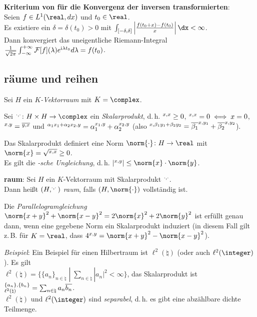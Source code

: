 \textbf{Kriterium von  für die Konvergenz der inversen
transformierten}:\\
Seien $f \in L^1(\real, dx)$ und $t_0 \in \real$.\\
Es existiere ein $\delta = \delta(t_0) > 0$ mit
$\int_{[-\delta, \delta]}
\left|\frac{f(t_0 + x) - f(t_0)}{x}\right| \dx < \infty$.\\
Dann konvergiert das uneigentliche Riemann-Integral
$\frac{1}{\sqrt{2\pi}}
\int_{-\infty}^{+\infty} \mathcal{F}[f](\lambda) e^{\mathrm{i} \lambda t_0} d\lambda = f(t_0)$.

\pagebreak

\subsection{%
    räume und reihen%
}

Sei $H$ ein \emph{$K$-Vektorraum} mit $K = \complex$.

Sei $\sp{\cdot, \cdot}\colon H \times H \rightarrow \complex$
ein \emph{Skalarprodukt}, d.\,h.
$\sp{x, x} \ge 0$,
$\sp{x, x} = 0 \iff x = 0$,
$\sp{x, y} = \overline{\sp{y, x}}$ und
$\sp{\alpha_1 x_1 + \alpha_2 x_2, y} =
\alpha_1 \sp{x_1, y} + \alpha_2 \sp{x_2, y}$
(also $\sp{x, \beta_1 y_1 + \beta_2 y_2} =
\overline{\beta_1} \sp{x, y_1} + \overline{\beta_2} \sp{x, y_2}$).

Das Skalarprodukt definiert eine Norm $\norm{\cdot}\colon H \rightarrow \real$
mit $\norm{x} = \sqrt{\sp{x, x}} \ge 0$.\\
Es gilt die \emph{-sche Ungleichung}, d.\,h.
$|\sp{x, y}| \le \norm{x} \cdot \norm{y}$.

\textbf{raum}:
Sei $H$ ein $K$-Vektorraum mit Skalarprodukt $\sp{\cdot, \cdot}$.\\
Dann heißt $(H, \sp{\cdot, \cdot})$ \emph{raum}, falls
$(H, \norm{\cdot})$ vollständig ist.

Die \emph{Parallelogramgleichung}
$\norm{x + y}^2 + \norm{x - y}^2 = 2 \norm{x}^2 + 2 \norm{y}^2$ ist
erfüllt genau dann, wenn eine gegebene Norm ein Skalarprodukt induziert
(in diesem Fall gilt z.\,B. für $K = \real$, dass
$4 \sp{x, y} = \norm{x + y}^2 - \norm{x - y}^2$).

\linie

\emph{Beispiel}:
Ein Beispiel für einen Hilbertraum ist
$\ell^2(\natural)$ (oder auch $\ell^2(\integer)$).
Es gilt\\
$\ell^2(\natural) = \{\{a_n\}_{n \in \natural} \;|\;
\sum_{n \in \natural} |a_n|^2 < \infty\}$,
das Skalarprodukt ist
$\sp{\{a_n\}, \{b_n\}}_{\ell^2(\natural)} =
\sum_{n \in \natural} a_n \overline{b_n}$.\\
$\ell^2(\natural)$ und $\ell^2(\integer)$ sind \emph{separabel}, d.\,h.
es gibt eine abzählbare dichte Teilmenge.

